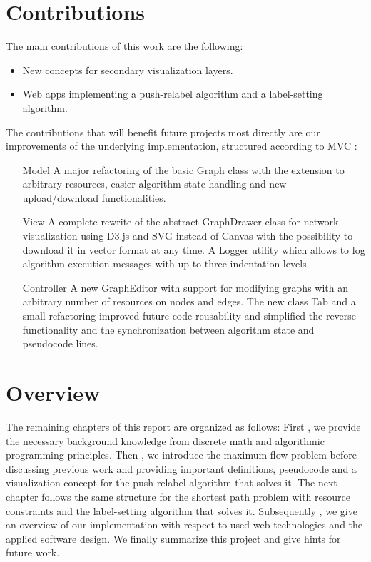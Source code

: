 \section{Contributions}
The main contributions of this work are the following:
\begin{itemize}
	\item New concepts for secondary visualization layers.
	\item Web apps implementing a push-relabel algorithm and a label-setting algorithm.
\end{itemize}
The contributions that will benefit future projects most directly are our improvements of the underlying implementation, structured according to MVC :
\begin{itemize}
	\item[Model] A major refactoring of the basic Graph class with the extension to arbitrary resources, easier algorithm state handling and new upload/download functionalities.
	\item[View] A complete rewrite of the abstract GraphDrawer class for network visualization using D3.js and SVG instead of Canvas with the possibility to download it in vector format at any time. A Logger utility which allows to log algorithm execution messages with up to three indentation levels.
	\item[Controller] A new GraphEditor with support for modifying graphs with an arbitrary number of resources on nodes and edges. The new class Tab and a small refactoring improved future code reusability and simplified the reverse functionality and the synchronization between algorithm state and pseudocode lines.
\end{itemize}


\section{Overview}
The remaining chapters of this report are organized as follows: First , we provide the necessary background knowledge from discrete math and algorithmic programming principles. Then , we introduce the maximum flow problem before discussing previous work and providing important definitions, pseudocode and a visualization concept for the push-relabel algorithm that solves it. The next chapter  follows the same structure for the shortest path problem with resource constraints and the label-setting algorithm that solves it. Subsequently , we give an overview of our implementation with respect to used web technologies and the applied software design. We finally  summarize this project and give hints for future work.